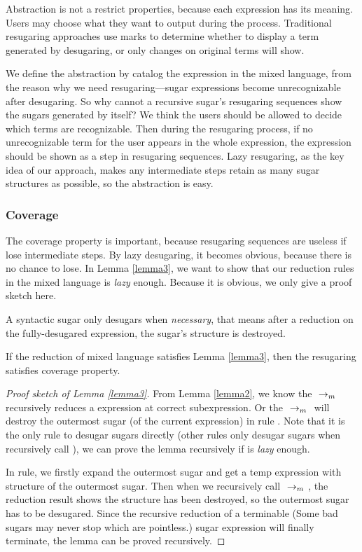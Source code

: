 Abstraction is not a restrict properties, because each expression has its meaning. Users may choose what they want to output during the process. Traditional resugaring approaches use marks to determine whether to display a term generated by desugaring, or only changes on original terms will show.

We define the abstraction by catalog the expression in the mixed language, from the reason why we need resugaring---sugar expressions become unrecognizable after desugaring. So why cannot a recursive sugar's resugaring sequences show the sugars generated by itself? We think the users should be allowed to decide which terms are recognizable. Then during the resugaring process, if no unrecognizable term for the user appears in the whole expression, the expression should be shown as a step in resugaring sequences. Lazy resugaring, as the key idea of our approach, makes any intermediate steps retain as many sugar structures as possible, so the abstraction is easy.

\subsubsection{Coverage}
The coverage property is important, because resugaring sequences are useless if lose intermediate steps. By lazy desugaring, it becomes obvious, because there is no chance to lose. In Lemma \ref{lemma3}, we want to show that our reduction rules in the mixed language is \emph{lazy} enough. Because it is obvious, we only give a proof sketch here.
\begin{lemma}
\label{lemma3}
A syntactic sugar only desugars when \emph{necessary}, that means after a reduction on the fully-desugared expression, the sugar's structure is destroyed.
\end{lemma}

\begin{Def}[Coverage]
If the reduction of mixed language satisfies Lemma \ref{lemma3}, then the resugaring satisfies coverage property.
\end{Def}



\begin{proof}[Proof sketch of Lemma \ref{lemma3}]
From Lemma \ref{lemma2}, we know the $~\rightarrow_m~$ recursively reduces a expression at correct subexpression. Or the $~\rightarrow_m~$ will destroy the outermost sugar (of the current expression) in rule . Note that it is the only rule to desugar sugars directly (other rules only desugar sugars when recursively call ), we can prove the lemma recursively if  is \emph{lazy} enough.

In  rule, we firstly expand the outermost sugar and get a temp expression with structure of the outermost sugar. Then when we recursively call $~\rightarrow_m~$, the reduction result shows the structure has been destroyed, so the outermost sugar has to be desugared. Since the recursive reduction of a terminable (Some bad sugars may never stop which are pointless.) sugar expression will finally terminate, the lemma can be proved recursively.
\end{proof}
